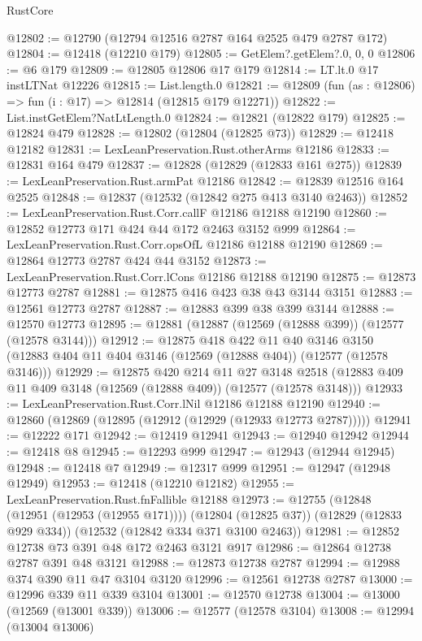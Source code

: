 \begin{lexlean}{RustCore}
\begin{coremodule}
@12802 := @12790 (@12794 @12516 @2787 @164 @2525 @479 @2787 @172)
@12804 := @12418 (@12210 @179)
@12805 := GetElem?.getElem?.{0, 0, 0}
@12806 := @6 @179
@12809 := @12805 @12806 @17 @179
@12814 := LT.lt.{0} @17 instLTNat @12226
@12815 := List.length.{0}
@12821 := @12809 (fun (as : @12806) => fun (i : @17) => @12814 (@12815 @179 @12271))
@12822 := List.instGetElem?NatLtLength.{0}
@12824 := @12821 (@12822 @179)
@12825 := @12824 @479
@12828 := @12802 (@12804 (@12825 @73))
@12829 := @12418 @12182
@12831 := LexLeanPreservation.Rust.otherArms @12186
@12833 := @12831 @164 @479
@12837 := @12828 (@12829 (@12833 @161 @275))
@12839 := LexLeanPreservation.Rust.armPat @12186
@12842 := @12839 @12516 @164 @2525
@12848 := @12837 (@12532 (@12842 @275 @413 @3140 @2463))
@12852 := LexLeanPreservation.Rust.Corr.callF @12186 @12188 @12190
@12860 := @12852 @12773 @171 @424 @44 @172 @2463 @3152 @999
@12864 := LexLeanPreservation.Rust.Corr.opsOfL @12186 @12188 @12190
@12869 := @12864 @12773 @2787 @424 @44 @3152
@12873 := LexLeanPreservation.Rust.Corr.lCons @12186 @12188 @12190
@12875 := @12873 @12773 @2787
@12881 := @12875 @416 @423 @38 @43 @3144 @3151
@12883 := @12561 @12773 @2787
@12887 := @12883 @399 @38 @399 @3144
@12888 := @12570 @12773
@12895 := @12881 (@12887 (@12569 (@12888 @399)) (@12577 (@12578 @3144)))
@12912 := @12875
    @418
    @422
    @11
    @40
    @3146
    @3150
    (@12883 @404 @11 @404 @3146 (@12569 (@12888 @404)) (@12577 (@12578 @3146)))
@12929 := @12875
    @420
    @214
    @11
    @27
    @3148
    @2518
    (@12883 @409 @11 @409 @3148 (@12569 (@12888 @409)) (@12577 (@12578 @3148)))
@12933 := LexLeanPreservation.Rust.Corr.lNil @12186 @12188 @12190
@12940 := @12860 (@12869 (@12895 (@12912 (@12929 (@12933 @12773 @2787)))))
@12941 := @12222 @171
@12942 := @12419 @12941
@12943 := @12940 @12942
@12944 := @12418 @8
@12945 := @12293 @999
@12947 := @12943 (@12944 @12945)
@12948 := @12418 @7
@12949 := @12317 @999
@12951 := @12947 (@12948 @12949)
@12953 := @12418 (@12210 @12182)
@12955 := LexLeanPreservation.Rust.fnFallible @12188
@12973 := @12755
    (@12848 (@12951 (@12953 (@12955 @171))))
    (@12804 (@12825 @37))
    (@12829 (@12833 @929 @334))
    (@12532 (@12842 @334 @371 @3100 @2463))
@12981 := @12852 @12738 @73 @391 @48 @172 @2463 @3121 @917
@12986 := @12864 @12738 @2787 @391 @48 @3121
@12988 := @12873 @12738 @2787
@12994 := @12988 @374 @390 @11 @47 @3104 @3120
@12996 := @12561 @12738 @2787
@13000 := @12996 @339 @11 @339 @3104
@13001 := @12570 @12738
@13004 := @13000 (@12569 (@13001 @339))
@13006 := @12577 (@12578 @3104)
@13008 := @12994 (@13004 @13006)

\end{coremodule}
\end{lexlean}
